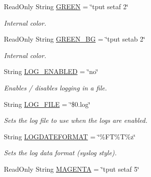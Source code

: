 \begin{DoxyCompactItemize}
\mbox{\label{bsfl_8sh_ae64c262ce1094f21457d2f78dd45a8fc}} 
Read\+Only String \hyperlink{bsfl_8sh_ae64c262ce1094f21457d2f78dd45a8fc}{G\+R\+E\+EN} = \char`\"{}tput setaf 2\char`\"{}
\begin{DoxyCompactList}\small\item\em Internal color. \end{DoxyCompactList}\item 
\mbox{\label{bsfl_8sh_a60eb725c193e2233500bee138be04262}} 
Read\+Only String \hyperlink{bsfl_8sh_a60eb725c193e2233500bee138be04262}{G\+R\+E\+E\+N\+\_\+\+BG} = \char`\"{}tput setab 2\char`\"{}
\begin{DoxyCompactList}\small\item\em Internal color. \end{DoxyCompactList}\item 
String \hyperlink{bsfl_8sh_a5996d87126284ce1bb8a03f752198d11}{L\+O\+G\+\_\+\+E\+N\+A\+B\+L\+ED} = \char`\"{}no\char`\"{}
\begin{DoxyCompactList}\small\item\em Enables / disables logging in a file. \end{DoxyCompactList}\item 
\mbox{\label{bsfl_8sh_a6de83433b64b24349644a4c2d839dcb7}} 
String \hyperlink{bsfl_8sh_a6de83433b64b24349644a4c2d839dcb7}{L\+O\+G\+\_\+\+F\+I\+LE} = \char`\"{}\$0.log\char`\"{}
\begin{DoxyCompactList}\small\item\em Sets the log file to use when the logs are enabled. \end{DoxyCompactList}\item 
\mbox{\label{bsfl_8sh_a20112ff15051ee8364a3cf7521e914b7}} 
String \hyperlink{bsfl_8sh_a20112ff15051ee8364a3cf7521e914b7}{L\+O\+G\+D\+A\+T\+E\+F\+O\+R\+M\+AT} = \char`\"{}\%FT\%T\%z\char`\"{}
\begin{DoxyCompactList}\small\item\em Sets the log data format (syslog style). \end{DoxyCompactList}\item 
\mbox{\label{bsfl_8sh_a5917cdec5e678bd52ef07d26c259423e}} 
Read\+Only String \hyperlink{bsfl_8sh_a5917cdec5e678bd52ef07d26c259423e}{M\+A\+G\+E\+N\+TA} = \char`\"{}tput setaf 5\char`\"{}

\end{DoxyCompactItemize}
